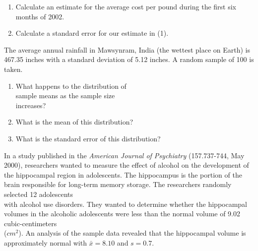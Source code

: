 \documentclass[11pt, chapterprefix=true]{scrbook}\usepackage[]{graphicx}\usepackage[]{color}
\begin{document}
\begin{exercises}
\begin{exercise}
\begin{enumerate}            
  \item Calculate an estimate for the average cost per pound during the first six \\ months of 2002.
  \item Calculate a standard error for our estimate in (1).
\end{enumerate}  

\end{exercise}
\begin{solution}  %

\end{solution}

\begin{exercise}  %

The average annual rainfall in Mawsynram, India (the wettest place on Earth) is 467.35 inches with a standard deviation of 5.12 inches. A random sample of 100 is taken.

\begin{enumerate}
  \item What happens to the distribution of \\ sample means as the sample size \\ increases?
  \item What is the mean of this distribution? 
  \item What is the standard error of this distribution?
\end{enumerate}

\end{exercise}
\begin{solution}  %

\end{solution}

\begin{exercise} %



In a study published in the \textit{American Journal of Psychiatry} (157.737-744, May 2000), researchers wanted to measure the effect of alcohol on the development of the hippocampal region in adolescents.  The hippocampus is the portion of the brain responsible for long-term memory storage.  The researchers randomly selected 12 adolescents \\ with alcohol use disorders.  They wanted to determine whether the hippocampal volumes in the alcoholic adolescents were less than the normal volume of 9.02 cubic-centimeters \\ ($cm^2$).  An analysis of the sample data revealed that the hippocampal volume is approximately normal  with $\bar{x} = 8.10$ and $s = 0.7$.  


\end{exercise}
\end{exercises}
\end{document}
